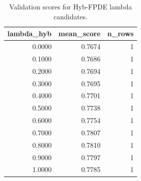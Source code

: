 \begin{table}[t]
\caption{Validation scores for Hyb-FPDE lambda candidates.}
\label{tab:lambda_distribution_computed}
\centering
\begin{tabular}{rrr}
\toprule
lambda\_hyb & mean\_score & n\_rows \\
\midrule
0.0000 & 0.7674 & 1 \\
0.1000 & 0.7686 & 1 \\
0.2000 & 0.7694 & 1 \\
0.3000 & 0.7695 & 1 \\
0.4000 & 0.7701 & 1 \\
0.5000 & 0.7738 & 1 \\
0.6000 & 0.7754 & 1 \\
0.7000 & 0.7807 & 1 \\
0.8000 & 0.7810 & 1 \\
0.9000 & 0.7797 & 1 \\
1.0000 & 0.7785 & 1 \\
\bottomrule
\end{tabular}

\end{table}
